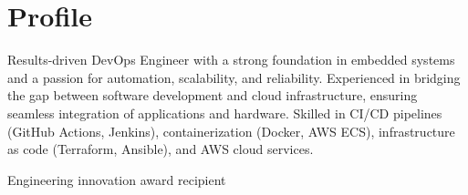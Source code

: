 \documentclass[letterpaper]{tenseconds} %
\begin{document}
\makeprofile %

\section{Profile}
\textnormal{\faInfo} Results-driven DevOps Engineer with a strong foundation in embedded systems and a passion for automation, scalability, and reliability. Experienced in bridging the gap between software development and cloud infrastructure, ensuring seamless integration of applications and hardware. Skilled in CI/CD pipelines (GitHub Actions, Jenkins), containerization (Docker, AWS ECS), infrastructure as code (Terraform, Ansible), and AWS cloud services.


 
\textnormal{\textcolor{materialamber}{\faTrophy}} Engineering innovation award recipient

\end{document}
